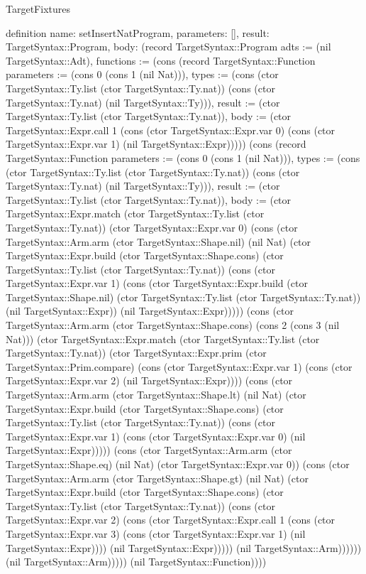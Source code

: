 \begin{lexlean}{TargetFixtures}
\begin{semanticmodule}
definition{
  name: setInsertNatProgram,
  parameters: [],
  result: TargetSyntax::Program,
  body: (record TargetSyntax::Program {adts := (nil TargetSyntax::Adt), functions := (cons (record TargetSyntax::Function {parameters := (cons 0 (cons 1 (nil Nat))), types := (cons (ctor TargetSyntax::Ty.list (ctor TargetSyntax::Ty.nat)) (cons (ctor TargetSyntax::Ty.nat) (nil TargetSyntax::Ty))), result := (ctor TargetSyntax::Ty.list (ctor TargetSyntax::Ty.nat)), body := (ctor TargetSyntax::Expr.call 1 (cons (ctor TargetSyntax::Expr.var 0) (cons (ctor TargetSyntax::Expr.var 1) (nil TargetSyntax::Expr))))}) (cons (record TargetSyntax::Function {parameters := (cons 0 (cons 1 (nil Nat))), types := (cons (ctor TargetSyntax::Ty.list (ctor TargetSyntax::Ty.nat)) (cons (ctor TargetSyntax::Ty.nat) (nil TargetSyntax::Ty))), result := (ctor TargetSyntax::Ty.list (ctor TargetSyntax::Ty.nat)), body := (ctor TargetSyntax::Expr.match (ctor TargetSyntax::Ty.list (ctor TargetSyntax::Ty.nat)) (ctor TargetSyntax::Expr.var 0) (cons (ctor TargetSyntax::Arm.arm (ctor TargetSyntax::Shape.nil) (nil Nat) (ctor TargetSyntax::Expr.build (ctor TargetSyntax::Shape.cons) (ctor TargetSyntax::Ty.list (ctor TargetSyntax::Ty.nat)) (cons (ctor TargetSyntax::Expr.var 1) (cons (ctor TargetSyntax::Expr.build (ctor TargetSyntax::Shape.nil) (ctor TargetSyntax::Ty.list (ctor TargetSyntax::Ty.nat)) (nil TargetSyntax::Expr)) (nil TargetSyntax::Expr))))) (cons (ctor TargetSyntax::Arm.arm (ctor TargetSyntax::Shape.cons) (cons 2 (cons 3 (nil Nat))) (ctor TargetSyntax::Expr.match (ctor TargetSyntax::Ty.list (ctor TargetSyntax::Ty.nat)) (ctor TargetSyntax::Expr.prim (ctor TargetSyntax::Prim.compare) (cons (ctor TargetSyntax::Expr.var 1) (cons (ctor TargetSyntax::Expr.var 2) (nil TargetSyntax::Expr)))) (cons (ctor TargetSyntax::Arm.arm (ctor TargetSyntax::Shape.lt) (nil Nat) (ctor TargetSyntax::Expr.build (ctor TargetSyntax::Shape.cons) (ctor TargetSyntax::Ty.list (ctor TargetSyntax::Ty.nat)) (cons (ctor TargetSyntax::Expr.var 1) (cons (ctor TargetSyntax::Expr.var 0) (nil TargetSyntax::Expr))))) (cons (ctor TargetSyntax::Arm.arm (ctor TargetSyntax::Shape.eq) (nil Nat) (ctor TargetSyntax::Expr.var 0)) (cons (ctor TargetSyntax::Arm.arm (ctor TargetSyntax::Shape.gt) (nil Nat) (ctor TargetSyntax::Expr.build (ctor TargetSyntax::Shape.cons) (ctor TargetSyntax::Ty.list (ctor TargetSyntax::Ty.nat)) (cons (ctor TargetSyntax::Expr.var 2) (cons (ctor TargetSyntax::Expr.call 1 (cons (ctor TargetSyntax::Expr.var 3) (cons (ctor TargetSyntax::Expr.var 1) (nil TargetSyntax::Expr)))) (nil TargetSyntax::Expr))))) (nil TargetSyntax::Arm)))))) (nil TargetSyntax::Arm))))}) (nil TargetSyntax::Function)))})
}


\end{semanticmodule}
\end{lexlean}
